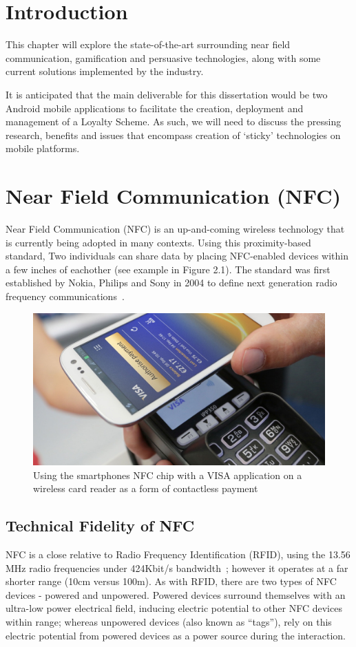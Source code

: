 \section{Introduction}
This chapter will explore the state-of-the-art surrounding near field communication, gamification and persuasive technologies, along with some current solutions implemented by the industry.

It is anticipated that the main deliverable for this dissertation would be two Android mobile applications to facilitate the creation, deployment and management of a Loyalty Scheme. As such, we will need to discuss the pressing research, benefits and issues that encompass creation of `sticky' technologies on mobile platforms. 

\section{Near Field Communication (NFC)}
Near Field Communication (NFC) is an up-and-coming wireless technology that is currently being adopted in many contexts. Using this proximity-based standard, Two individuals can share data by placing NFC-enabled devices within a few inches of eachother (see example in Figure 2.1). The standard was first established by Nokia, Philips and Sony in 2004 to define next generation radio frequency communications~\cite{nfcforum}.
\begin{figure}[H]
  \centering
    \includegraphics[width=1\textwidth]{img/visa-nfc-samsung.jpg}
      \caption{Using the smartphones NFC chip with a VISA application on a wireless card reader as a form of contactless payment}
\end{figure}

\subsection{Technical Fidelity of NFC}
NFC is a close relative to Radio Frequency Identification (RFID), using the 13.56 MHz radio frequencies under 424Kbit/s bandwidth~\cite{nfcloyal}; however it operates at a far shorter range (10cm versus 100m). As with RFID, there are two types of NFC devices - powered and unpowered. Powered devices surround themselves with an ultra-low power electrical field, inducing electric potential to other NFC devices within range; whereas unpowered devices (also known as ``tags''), rely on this electric potential from powered devices as a power source during the interaction.

